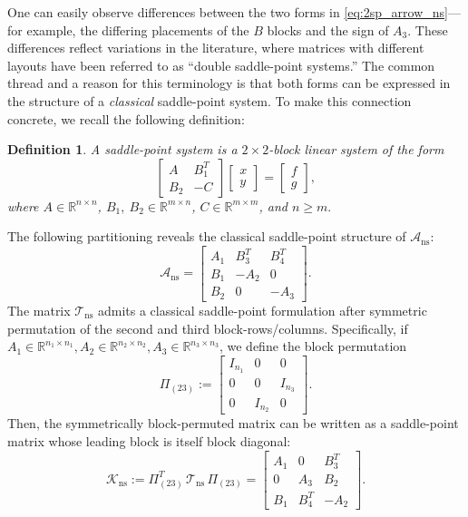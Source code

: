 \documentclass{article}
\newtheorem{definition}{Definition}
\newcommand{\sA}{\mathcal{A}}
\newcommand{\sK}{\mathcal{K}}
\newcommand{\sT}{\mathcal{T}}
\begin{document}
One can easily observe differences between the two forms in \eqref{eq:2sp_arrow_ns}—for example, the differing placements of the $B$ blocks and the sign of $A_3$. These differences  reflect variations in the literature, where matrices with different layouts have been referred to as ``double saddle-point systems.” The common thread and a reason for this terminology is that both forms can be expressed in the structure of a {\em classical} saddle-point system. %
To make this connection concrete, we recall the following definition:

\begin{definition}\cite[Eq. (1.1)--(1.2)]{bgl05}
\label{defn:sp}
A saddle-point system is a $2 \times 2$-block linear system of the form
$$ \begin{bmatrix} A & B_1^T \\ B_2 & -C \end{bmatrix} \begin{bmatrix} x \\ y \end{bmatrix} = \begin{bmatrix} f \\ g \end{bmatrix},$$ where $A \in {\mathbb R}^{n \times n}$, $B_1, \ B_2 \in {\mathbb R}^{m \times n}$, $C \in {\mathbb R}^{m \times m}$, and $n \ge m.$
\end{definition}

The following partitioning reveals the classical saddle-point structure of $\sA_{\text{ns}}$:
\[
\sA_{\text{ns}} = \left[\begin{array}{c|cc}
A_1 & B_3^T & B_4^T \\
\hline
B_1 & -A_2 & 0 \\
B_2 & 0 & -A_3
\end{array}\right].
\]
The matrix $\sT_{\text{ns}}$ admits a classical saddle-point formulation after symmetric permutation of the second and third block-rows/columns. Specifically, if $A_1 \in {\mathbb R}^{n_1 \times n_1}, A_2 \in {\mathbb R}^{n_2 \times n_2}, A_3 \in {\mathbb R}^{n_3 \times n_3}$, we define the block permutation
\[
\Pi_{(23)} :=
\begin{bmatrix}
I_{n_1} & 0        & 0 \\
0       & 0        & I_{n_3} \\
0       & I_{n_2}  & 0
\end{bmatrix}.
\]
Then, the symmetrically block-permuted matrix can be written as a saddle-point matrix whose leading block is itself block diagonal:
\[
\sK_{\mathrm{ns}} := \Pi_{(23)}^{T}\, \sT_{\mathrm{ns}}\, \Pi_{(23)} = \left[\begin{array}{cc|c}
A_1 & 0 & B_3^T \\
0 & A_3 & B_2 \\
\hline
B_1 & B_4^T & -A_2
\end{array}\right].
\] 
\end{document}
